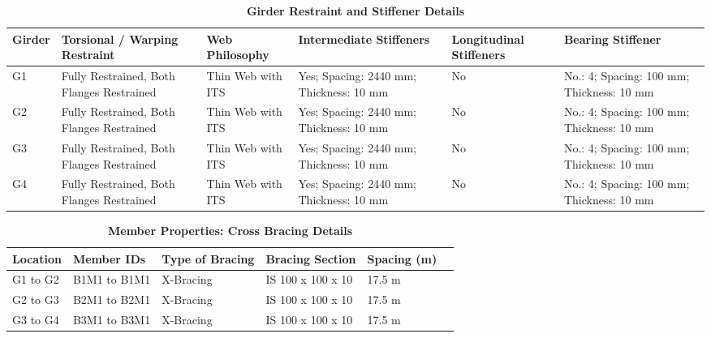 \documentclass[12pt,a4paper]{report}
\numberwithin{table}{chapter}
\numberwithin{figure}{chapter}
\begin{document}
\vspace{4pt}
\begin{longtable}{|L{1.4cm}|p{2.2cm}|p{2.2cm}|p{3.0cm}|p{2.4cm}|p{2.2cm}|}
\caption{\textbf{Girder Restraint and Stiffener Details}}\\
\hline
\textbf{Girder} & \textbf{Torsional / Warping Restraint} & \textbf{Web Philosophy} & \textbf{Intermediate Stiffeners} & \textbf{Longitudinal Stiffeners} & \textbf{Bearing Stiffener} \\[6pt]
\hline
\endfirsthead
\endhead

G1 & Fully Restrained, Both Flanges Restrained & Thin Web with ITS & Yes; Spacing: 2440 mm; Thickness: 10 mm & No & No.: 4; Spacing: 100 mm; Thickness: 10 mm \\[8pt]
\hline
G2 & Fully Restrained, Both Flanges Restrained & Thin Web with ITS & Yes; Spacing: 2440 mm; Thickness: 10 mm & No & No.: 4; Spacing: 100 mm; Thickness: 10 mm \\[8pt]
\hline
G3 & Fully Restrained, Both Flanges Restrained & Thin Web with ITS & Yes; Spacing: 2440 mm; Thickness: 10 mm & No & No.: 4; Spacing: 100 mm; Thickness: 10 mm \\[8pt]
\hline
G4 & Fully Restrained, Both Flanges Restrained & Thin Web with ITS & Yes; Spacing: 2440 mm; Thickness: 10 mm & No & No.: 4; Spacing: 100 mm; Thickness: 10 mm \\[8pt]
\hline
\end{longtable}



\newpage

\vspace{0.4em}
\setlength{\tabcolsep}{4pt}
\setlength\LTleft{0pt}
\setlength\LTright{\fill}

\begin{longtable}{|L{2.2cm}|L{2.2cm}|L{3.0cm}|L{2.5cm}|C{1.8cm}|C{1.8cm}|}
\caption{\textbf{Member Properties: Cross Bracing Details}}
\hline
\textbf{Location} & \textbf{Member IDs} & \textbf{Type of Bracing} & \textbf{Bracing Section} & \textbf{Spacing (m)} \\
\hline
G1 to G2 & B1M1 to B1M1 & X-Bracing & IS 100 x 100 x 10 & 17.5 m \\[6pt]
\hline
G2 to G3 & B2M1 to B2M1 & X-Bracing & IS 100 x 100 x 10 & 17.5 m \\[6pt]
\hline
G3 to G4 & B3M1 to B3M1 & X-Bracing & IS 100 x 100 x 10 & 17.5 m \\[6pt]
\hline
\end{longtable}

\vspace{0.4em}
\noindent
\setlength{\tabcolsep}{4pt}
\setlength\LTleft{0pt}
\setlength\LTright{\fill}
\end{document}

